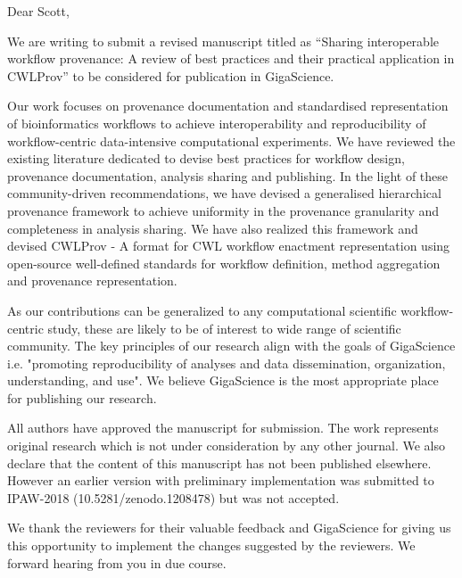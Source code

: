 Dear Scott, 

We are writing to submit a revised manuscript titled as “Sharing interoperable workflow provenance: A review of best practices and their practical application in CWLProv” to be considered for publication in GigaScience. 

Our work focuses on provenance documentation and standardised representation of bioinformatics workflows to achieve interoperability and reproducibility of workflow-centric data-intensive computational experiments. We have reviewed the existing literature dedicated to devise best practices for workflow design, provenance documentation, analysis sharing and publishing. In the light of these community-driven recommendations, we have devised a generalised hierarchical provenance framework to achieve uniformity in the provenance granularity and completeness in analysis sharing. We have also realized this framework and devised CWLProv - A format for CWL workflow enactment representation using open-source well-defined standards for workflow definition, method aggregation and provenance representation. 

As our contributions can be generalized to any computational scientific workflow-centric study, these are likely to be of interest to wide range of scientific community. The key principles of our research align with the goals of GigaScience i.e. "promoting reproducibility of analyses and data dissemination, organization, understanding, and use". We believe GigaScience is the most appropriate place for publishing our research. 

All authors have approved the manuscript for submission. The work represents original research which is not under consideration by any other journal. We also declare that the content of this manuscript has not been published elsewhere. However an earlier version with preliminary implementation was submitted to IPAW-2018 (10.5281/zenodo.1208478) but was not accepted.

We thank the reviewers for their valuable feedback and GigaScience for giving us this opportunity to implement the changes suggested by the reviewers. We forward hearing from you in due course.
